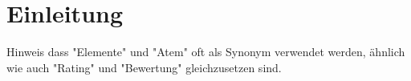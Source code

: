 \section{Einleitung}


Hinweis dass "Elemente" und "Atem" oft als Synonym verwendet werden, ähnlich wie auch "Rating" und "Bewertung" gleichzusetzen sind.
